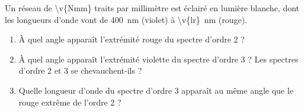 Un réseau de \num{\v{Nmm}} traits par millimètre est éclairé en lumière blanche, dont les longueurs d'onde vont de \qty{400}{nm} (violet) à \qty{\v{lr}}{nm} (rouge).

\begin{enumerate}[label=\alph*)]
    \item À quel angle apparaît l'extrémité rouge du spectre d'ordre 2 ?
    \item À quel angle apparaît l'extrémité violette du spectre d'ordre 3 ? Les spectres d'ordre 2 et 3 se chevauchent-ils ?
    \item Quelle longueur d'onde du spectre d'ordre 3 apparaît au même angle que le rouge extrême de l'ordre 2 ?
\end{enumerate}
